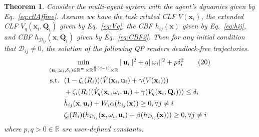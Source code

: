 \documentclass[letterpaper, 10 pt, conference]{ieeeconf}
\theoremstyle{plain}
\newtheorem{theorem}{Theorem}
\begin{document}
\begin{theorem}
Consider the multi-agent system with the agent's dynamics given by Eq.~\eqref{eq:ctlAffine}. Assume we have the task related CLF $V(\mathbf{x}_i)$, the extended CLF $V_q(\mathbf{x}_i, \mathbf{Q}_i)$ given by Eq.~\eqref{eq:Vq}, the CBF $h_{ij}(\mathbf{x})$ given by Eq.~\eqref{eq:hij}, and CBF $h_{\mathcal{D}_{ij}}(\mathbf{x}, \mathbf{Q}_i)$ given by Eq.~\eqref{eq:CBF2}. Then for any initial condition that $\mathcal{D}_{ij} \neq 0$,
the solution of the following QP renders deadlock-free trajectories.
\begin{subequations}\begin{align} \label{eq:prop}
&\min _{ \!\!\substack {(\mathbf{u}_i,\omega_i,\delta_i) \in \mathbb {R}^{m} \times \mathbb {R}^{\frac {d}{2}(d-1)} \times \mathbb {R} }\!\!}~ \| {\mathbf{u}_i} \|^{2} + q \| {\omega_i } \|^{2} + p \delta_i ^{2} \tag{20} \\
& \mathrm{s}.\mathrm{t}.~~ (1 - \zeta_i(R_i))(\dot{V}(\mathbf{x}_i, \mathbf{u}_i) + \gamma (V(\mathbf{x}_i))) \notag \\
& \qquad + \zeta_i(R_i) (\dot{V}_q(\mathbf{x}_i, \omega_i, \mathbf{u}_i) + \gamma (V_q(\mathbf{x}_i, \mathbf{Q}_i))) \le \delta_i \label{CLF}
\\
&\qquad \dot{h}_{ij}(\mathbf{x}, \mathbf{u}_i) + W_i \alpha (h_{ij}(\mathbf{x})) \ge 0, \forall j \neq i \label{CBF1}
\\
&\qquad \zeta_i(R_i)(\dot{h}_{\mathcal{D}_{ij}}(\mathbf{x}, \omega_i, \mathbf{u}_i) + \beta (h_{\mathcal {D}_{ij}}(\mathbf{x}))) \ge 0, \forall j \neq i  \label{CBF2}
\end{align} \end{subequations}
where $p, q > 0 \in \mathbb{R}$ are user-defined constants. 

\end{theorem}
\end{document}
